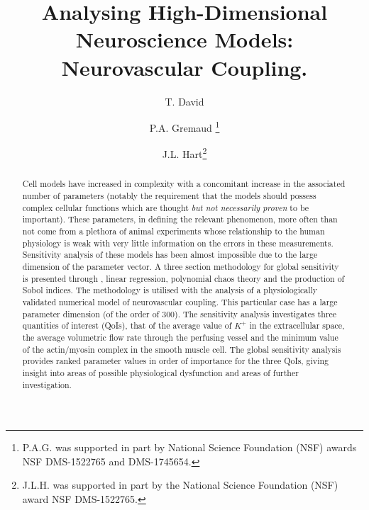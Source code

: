 \documentclass[smallextended]{svjour3}
\numberwithin{equation}{section}
\begin{document}
\title{Analysing High-Dimensional Neuroscience Models: Neurovascular Coupling. }
\author{ T. David \and P.A. Gremaud  \thanks{P.A.G. was supported in part by National Science Foundation (NSF) awards NSF DMS-1522765 and DMS-1745654.}\and J.L. Hart\thanks{J.L.H. was supported in part by the National Science Foundation (NSF) award NSF DMS-1522765.}}
\maketitle
\thispagestyle{empty}

\begin{abstract}
Cell models have increased in complexity with a concomitant increase in the associated number of parameters (notably the requirement that the models should possess complex cellular functions which are thought \textit{but not necessarily proven} to be important). These parameters, in defining the relevant phenomenon, more often than not come from a plethora of animal experiments whose relationship to the human physiology is weak with very little information on the errors in these measurements.  Sensitivity analysis of these models has been almost impossible due to the large dimension of the parameter vector. A three section methodology for global sensitivity is presented through , linear regression, polynomial chaos theory and the production of Sobol indices. The methodology is utilised with the analysis of a physiologically validated numerical model of  neurovascular coupling. This particular case has a large parameter dimension (of the order of 300). The sensitivity analysis investigates three quantities of interest (QoIs), that of the  average value of $K^+$ in the extracellular space, the average volumetric flow rate through the perfusing vessel and the minimum value of the actin/myosin complex in the smooth muscle cell. The global sensitivity analysis provides ranked parameter values in order of importance for the three QoIs, giving insight into areas of possible physiological dysfunction and areas of further investigation. 
\end{abstract}




  











\end{document}
